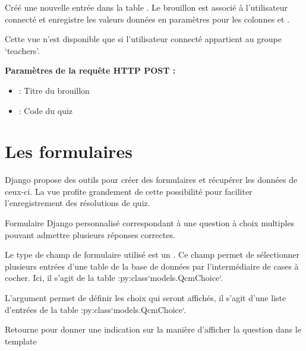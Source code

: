\documentclass[a4paper,11pt,openany,oneside]{sphinxmanual}
\begin{document}

\begin{fulllineitems}
\label{source:quiz.views.savedraft}
Créé une nouvelle entrée dans la table . Le brouillon est associé
à l'utilisateur connecté et enregistre les valeurs données en paramètres pour
les colonnes  et .

Cette vue n'est disponible que si l'utilisateur connecté appartient au groupe
`teachers'.

\textbf{Paramètres de la requête HTTP POST :}
\begin{itemize}
\item {} 
 : Titre du brouillon

\item {} 
 : Code du quiz

\end{itemize}

\end{fulllineitems}



\section{Les formulaires}
\label{source:les-formulaires}
Django propose des outils pour créer des formulaires et récupérer les
données de ceux-ci. La vue  profite grandement de cette possibilité
pour faciliter l'enregistrement des résolutions de quiz.
\label{source:module-quiz.forms}

\begin{fulllineitems}
\label{source:quiz.forms.CheckboxForm}
Formulaire Django personnalisé correspondant à une question à choix multiples
pouvant admettre plusieurs réponses correctes.

Le type de champ de formulaire utilisé est un . Ce champ permet
de sélectionner plusieurs entrées d'une table de la base de données par l'intermédiaire
de cases à cocher. Ici, il s'agit
de la table :py:class{}`models.QcmChoice{}`.

L'argument  permet de définir les choix qui seront affichés, il s'agit
d'une liste d'entrées de la table :py:class{}`models.QcmChoice{}`.

\begin{fulllineitems}
\label{source:quiz.forms.CheckboxForm.get_type}
Retourne  pour donner une indication sur la manière d'afficher 
la question dans le template

\end{fulllineitems}


\end{fulllineitems}
\end{document}
